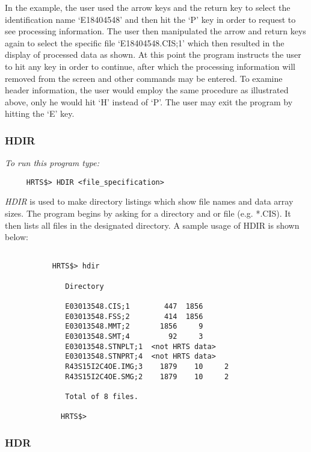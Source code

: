     In the example, the user used the arrow keys and the return key to
    select the identification name `E18404548' and then hit the `P' key in
    order to request to see processing information.  The user then
    manipulated the arrow and return keys again to select the specific file
    `E18404548.CIS;1' which then resulted in the display of processed data
    as shown.  At this point the program instructs the user to hit any key
    in order to continue, after which the processing information will
    removed from the screen and other commands may be entered.
    To examine header information, the user would employ the same
    procedure as illustrated above, only he would hit `H' instead of `P'.
    The user may exit the program by hitting the `E' key.

\subsubsection{HDIR}

{\em To run this program type:}
\begin{verbatim}
     HRTS$> HDIR <file_specification>
\end{verbatim}
   {\em HDIR} is used to make directory listings which show file names and
    data array sizes.  The program begins by asking for a directory and or file
    (e.g. *.CIS). It then lists all files in the designated directory.
    A sample usage of HDIR is shown below:

\begin{verbatim}

           HRTS$> hdir

              Directory

              E03013548.CIS;1        447  1856
              E03013548.FSS;2        414  1856
              E03013548.MMT;2       1856     9
              E03013548.SMT;4         92     3
              E03013548.STNPLT;1  <not HRTS data>
              E03013548.STNPRT;4  <not HRTS data>
              R43S15I2C4OE.IMG;3    1879    10     2
              R43S15I2C4OE.SMG;2    1879    10     2

              Total of 8 files.

             HRTS$>

\end{verbatim}

\subsubsection{HDR}

